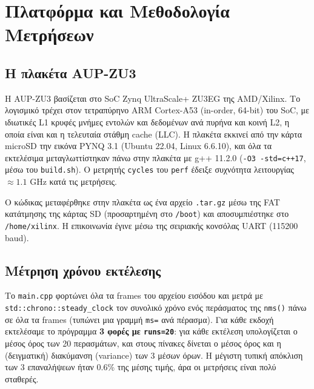 \documentclass[11pt,a4paper]{article}
\newcommand{\en}[1]{\textlatin{#1}}
\begin{document}
\section{Πλατφόρμα και Μεθοδολογία Μετρήσεων}
\subsection{Η πλακέτα \en{AUP-ZU3}}
Η \en{AUP-ZU3} βασίζεται στο \en{SoC Zynq UltraScale+ ZU3EG} της \en{AMD/Xilinx}. Το λογισμικό τρέχει στον τετραπύρηνο \en{ARM Cortex-A53} (\en{in-order}, 64-\en{bit}) του \en{SoC}, με ιδιωτικές \en{L1} κρυφές μνήμες εντολών και δεδομένων ανά πυρήνα και κοινή \en{L2}, η οποία είναι και η τελευταία στάθμη \en{cache} (\en{LLC}). Η πλακέτα εκκινεί από την κάρτα \en{microSD} την εικόνα \en{PYNQ 3.1} (\en{Ubuntu 22.04}, \en{Linux 6.6.10}), και όλα τα εκτελέσιμα μεταγλωττίστηκαν πάνω στην πλακέτα με \en{g++ 11.2.0} (\en{\texttt{-O3 -std=c++17}}, μέσω του \en{\texttt{build.sh}}). Ο μετρητής \en{\texttt{cycles}} του \en{\texttt{perf}} έδειξε συχνότητα λειτουργίας $\approx 1.1$ \en{GHz} κατά τις μετρήσεις.

Ο κώδικας μεταφέρθηκε στην πλακέτα ως ένα αρχείο \en{\texttt{.tar.gz}} μέσω της \en{FAT} κατάτμησης της κάρτας \en{SD} (προσαρτημένη στο \en{\texttt{/boot}}) και αποσυμπιέστηκε στο \en{\texttt{/home/xilinx}}. Η επικοινωνία έγινε μέσω της σειριακής κονσόλας \en{UART} (115200 \en{baud}).

\subsection{Μέτρηση χρόνου εκτέλεσης}
Το \en{\texttt{main.cpp}} φορτώνει όλα τα \en{frames} του αρχείου εισόδου και μετρά με \en{\texttt{std::chrono::steady\_clock}} τον συνολικό χρόνο ενός περάσματος της \en{\texttt{nms()}} πάνω σε όλα τα \en{frames} (τυπώνει μια γραμμή \en{\texttt{ms=}} ανά πέρασμα). Για κάθε εκδοχή εκτελέσαμε το πρόγραμμα \textbf{3 φορές με \en{\texttt{runs=20}}}: για κάθε εκτέλεση υπολογίζεται ο μέσος όρος των 20 περασμάτων, και στους πίνακες δίνεται ο μέσος όρος και η (δειγματική) διακύμανση (\en{variance}) των 3 μέσων όρων. Η μέγιστη τυπική απόκλιση των 3 επαναλήψεων ήταν 0.6\% της μέσης τιμής, άρα οι μετρήσεις είναι πολύ σταθερές.
\end{document}
